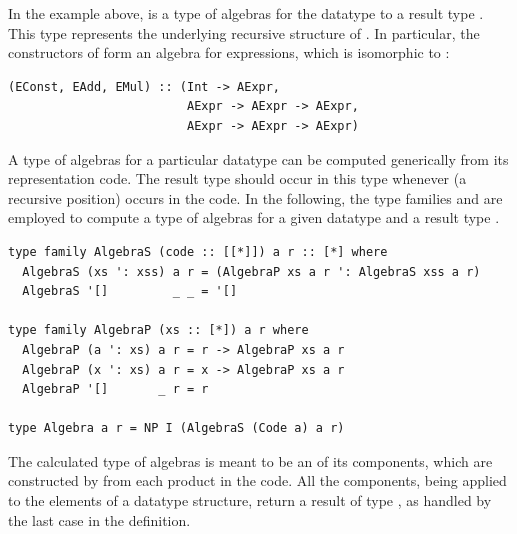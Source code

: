 \documentclass[sigplan,screen,review,anonymous]{acmart}
\begin{document}
In the example above,  is a type of algebras for the datatype  to a result type . This type represents the underlying recursive structure of . In particular, the constructors of  form an algebra for expressions, which is isomorphic to :
\begin{lstlisting}[style=fancy]
(EConst, EAdd, EMul) :: (Int -> AExpr,
                         AExpr -> AExpr -> AExpr,
                         AExpr -> AExpr -> AExpr)
\end{lstlisting}
A type of algebras for a particular datatype  can be computed generically from its representation code. The result type  should occur in this type whenever  (a recursive position) occurs in the code. In the following, the type families  and  are employed to compute a type of algebras for a given datatype  and a result type .
\begin{lstlisting}[style=fancy]
type family AlgebraS (code :: [[*]]) a r :: [*] where
  AlgebraS (xs ': xss) a r = (AlgebraP xs a r ': AlgebraS xss a r)
  AlgebraS '[]         _ _ = '[]

type family AlgebraP (xs :: [*]) a r where
  AlgebraP (a ': xs) a r = r -> AlgebraP xs a r
  AlgebraP (x ': xs) a r = x -> AlgebraP xs a r
  AlgebraP '[]       _ r = r

type Algebra a r = NP I (AlgebraS (Code a) a r)
\end{lstlisting}
The calculated type of algebras  is meant to be an  of its components, which are constructed by  from each product in the code. All the components, being applied to the elements of a datatype structure, return a result of type , as handled by the last case in the  definition.
\end{document}
